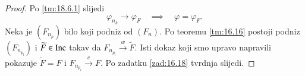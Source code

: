\begin{proof}
    Po \ref{tm:18.6.1} slijedi
    \begin{equation*}
        \varphi_{n_k} \to \varphi_F \quad \implies \quad \varphi = \varphi_F.
    \end{equation*}
    Neka je $(F_{n_p})$ bilo koji podniz od $(F_n)$.
    Po teoremu \ref{tm:16.16} postoji podniz $(F_{n_{p_l}})$ i $\widetilde{F} \in \mathrm{Inc}$ takav da $F_{n_{p_l}} \xrightarrow{w} \widetilde{F}$.
    Isti dokaz koji smo upravo napravili pokazuje $\widetilde{F} = F$ i $F_{n_{p_l}} \xrightarrow{c} F$.
    Po zadatku \ref{zad:16.18} tvrdnja slijedi.
\end{proof}